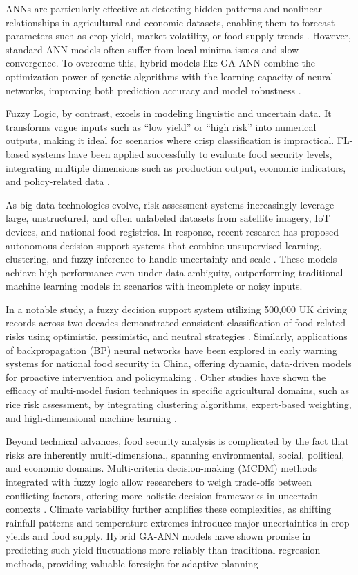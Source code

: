 \documentclass[preprint,12pt]{elsarticle}
\begin{document}
	ANNs are particularly effective at detecting hidden patterns and
	nonlinear relationships in agricultural and economic datasets, enabling
	them to forecast parameters such as crop yield, market volatility, or
	food supply trends \cite{ref2}. However, standard ANN models often suffer from
	local minima issues and slow convergence. To overcome this, hybrid
	models like GA-ANN combine the optimization power of genetic algorithms
	with the learning capacity of neural networks, improving both prediction
	accuracy and model robustness \cite{ref3}.
	
	Fuzzy Logic, by contrast, excels in modeling linguistic and uncertain
	data. It transforms vague inputs such as ``low yield'' or ``high risk'' into
	numerical outputs, making it ideal for scenarios where crisp
	classification is impractical. FL-based systems have been applied
	successfully to evaluate food security levels, integrating multiple
	dimensions such as production output, economic indicators, and
	policy-related data \cite{ref4}.
	
	As big data technologies evolve, risk assessment systems increasingly
	leverage large, unstructured, and often unlabeled datasets from
	satellite imagery, IoT devices, and national food registries. In
	response, recent research has proposed autonomous decision support
	systems that combine unsupervised learning, clustering, and fuzzy
	inference to handle uncertainty and scale \cite{ref5}. These models achieve
	high performance even under data ambiguity, outperforming traditional
	machine learning models in scenarios with incomplete or noisy inputs.
	
	In a notable study, a fuzzy decision support system utilizing 500,000 UK
	driving records across two decades demonstrated consistent
	classification of food-related risks using optimistic, pessimistic, and
	neutral strategies \cite{ref5}. Similarly, applications of backpropagation
	(BP) neural networks have been explored in early warning systems for
	national food security in China, offering dynamic, data-driven models
	for proactive intervention and policymaking \cite{ref6}. Other studies have
	shown the efficacy of multi-model fusion techniques in specific
	agricultural domains, such as rice risk assessment, by integrating
	clustering algorithms, expert-based weighting, and high-dimensional
	machine learning \cite{ref1}.
	
	Beyond technical advances, food security analysis is complicated by the
	fact that risks are inherently multi-dimensional, spanning
	environmental, social, political, and economic domains. Multi-criteria
	decision-making (MCDM) methods integrated with fuzzy logic allow
	researchers to weigh trade-offs between conflicting factors, offering
	more holistic decision frameworks in uncertain contexts \cite{ref94}. Climate
	variability further amplifies these complexities, as shifting rainfall
	patterns and temperature extremes introduce major uncertainties in crop
	yields and food supply. Hybrid GA-ANN models have shown promise in
	predicting such yield fluctuations more reliably than traditional
	regression methods, providing valuable foresight for adaptive planning
	
\end{document}

